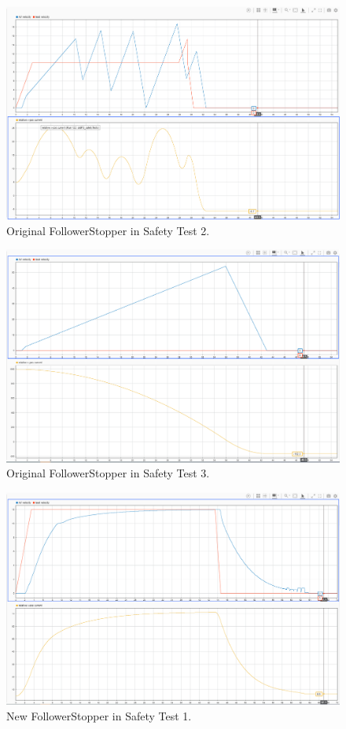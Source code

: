 \documentclass[conference]{IEEEtran}
\begin{document}
\begin{appendix}
\begin{figure}[htbp]
\centerline{\includegraphics[width=5.71 in]{oldFS_safety2.png}}
\caption{Original FollowerStopper in Safety Test 2.}
\label{oldsafe2}
\end{figure}

\begin{figure}[htbp]
\centerline{\includegraphics[width=5.71 in]{oldFS_safety3.png}}
\caption{Original FollowerStopper in Safety Test 3.}
\label{oldsafe3}
\end{figure}

\begin{figure}[htbp]
\centerline{\includegraphics[width=5.71 in]{newFS_safety1.png}}
\caption{New FollowerStopper in Safety Test 1.}
\label{newsafe1}
\end{figure}


\end{appendix}
\end{document}
